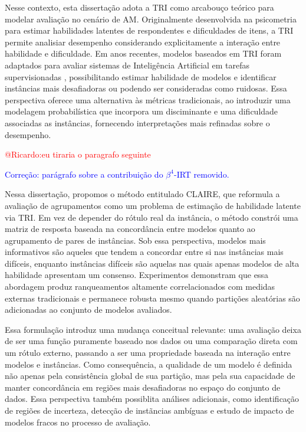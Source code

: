 Nesse contexto, esta dissertação adota a \gls{TRI} \cite{embretson2013item} como arcabouço teórico para modelar avaliação no cenário de \gls{AM}. Originalmente desenvolvida na psicometria para estimar habilidades latentes de respondentes e dificuldades de itens, a \gls{TRI} permite analisiar desempenho considerando explicitamente a interação entre habilidade e dificuldade. Em anos recentes, modelos baseados em TRI foram adaptados para avaliar sistemas de Inteligência Artificial em tarefas supervisionadas \cite{chen2019birt, martinez2016making, moraes2020item, moraes2022evaluating}, possibilitando estimar habilidade de modelos e identificar instâncias mais desafiadoras ou podendo ser consideradas como ruidosas. Essa perspectiva oferece uma alternativa às métricas tradicionais, ao introduzir uma modelagem probabilística que incorpora um disciminante e uma dificuldade associadas as instâncias, fornecendo interpretações mais refinadas sobre o desempenho.

\textcolor{red}{@Ricardo:eu tiraria o paragrafo seguinte}

\textcolor{blue}{Correção: parágrafo sobre a contribuição do $\beta^{4}$-\gls{IRT} removido.}

Nessa dissertação, propomos o método entitulado \gls{CLAIRE}, que reformula a avaliação de agrupamentos como um problema de estimação de habilidade latente via \gls{TRI}. Em vez de depender do rótulo real da instância, o método constrói uma matriz de resposta baseada na concordância entre modelos quanto ao agrupamento de pares de instâncias. Sob essa perspectiva, modelos mais informativos são aqueles que tendem a concordar entre si nas instâncias mais difíceis, enquanto instâncias difíceis são aquelas nas quais apenas modelos de alta habilidade apresentam um consenso. Experimentos demonstram que essa abordagem produz ranqueamentos altamente correlacionados com medidas externas tradicionais e permanece robusta mesmo quando partições aleatórias são adicionadas ao conjunto de modelos avaliados.


Essa formulação introduz uma mudança conceitual relevante: uma avaliação deixa de ser uma função puramente baseado nos dados ou uma comparação direta com um rótulo externo, passando a ser uma propriedade baseada na interação entre modelos e instâncias. Como consequência, a qualidade de um modelo é definida não apenas pela consistência global de sua partição, mas pela sua capacidade de manter concordância em regiões mais desafiadoras no espaço do conjunto de dados. Essa perspectiva também possiblita análises adicionais, como identificação de regiões de incerteza, detecção de instãncias ambíguas e estudo de impacto de modelos fracos no processo de avaliação.

